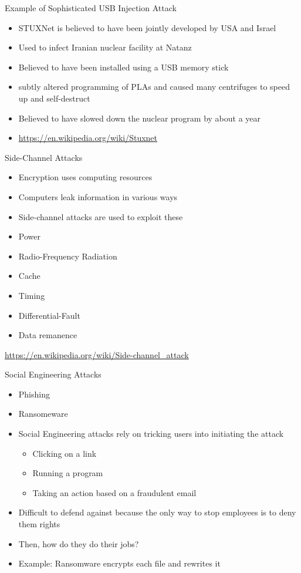 \begin{withoutheadline}
\begin{frame}{Example of Sophisticated USB Injection Attack}
\begin{itemize}
    \item STUXNet is believed to have been jointly developed by USA and Israel
    \item Used to infect Iranian nuclear facility at Natanz
    \item Believed to have been installed using a USB memory stick
    \item subtly altered programming of PLAs and caused many centrifuges to speed up and self-destruct
    \item Believed to have slowed down the nuclear program by about a year
    \item \url{https://en.wikipedia.org/wiki/Stuxnet}
\end{itemize}
\end{frame}

\begin{frame}{Side-Channel Attacks}
\begin{itemize}
    \item Encryption uses computing resources
    \item Computers leak information in various ways
    \item Side-channel attacks are used to exploit these
    \item Power
    \item Radio-Frequency Radiation
    \item Cache
    \item Timing
    \item Differential-Fault
    \item Data remanence
\end{itemize}
\url{https://en.wikipedia.org/wiki/Side-channel_attack}
\end{frame}

\begin{frame}{Social Engineering Attacks}
\begin{itemize}
    \item Phishing
    \item Ransomeware
    \item Social Engineering attacks rely on tricking users into initiating the attack
    \begin{itemize}
        \item Clicking on a link
        \item Running a program
        \item Taking an action based on a fraudulent email
    \end{itemize}
    \item Difficult to defend against because the only way to stop employees is to deny them rights
    \item Then, how do they do their jobs?
    \item Example: Ransomware encrypts each file and rewrites it
\end{itemize}
\end{frame}


\end{withoutheadline}
